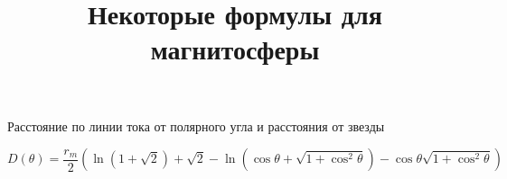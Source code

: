 \documentclass{article}
\begin{document}
\title{Некоторые формулы для магнитосферы}
\maketitle

Расстояние по линии тока от полярного угла и расстояния от звезды

\[D(\theta) = \frac{r_m}{2}\left( \ln(1+\sqrt{2}) + \sqrt{2} - \ln(\cos\theta + \sqrt{1+\cos^2\theta}) - \cos\theta\sqrt{1+\cos^2\theta} \right)\]
\end{document}

